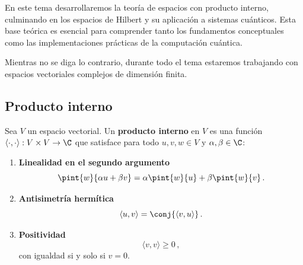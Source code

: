 En este tema desarrollaremos la teoría de espacios con producto interno, culminando en los espacios de Hilbert y su aplicación a sistemas cuánticos. Esta base teórica es esencial para comprender tanto los fundamentos conceptuales como las implementaciones prácticas de la computación cuántica.

Mientras no se diga lo contrario, durante todo el tema estaremos trabajando con espacios vectoriales complejos de dimensión finita.

\subsection{Producto interno}

\begin{defi}
  Sea $V$ un espacio vectorial. Un \textbf{producto interno} en $V$ es una función $\langle \cdot, \cdot \rangle: V \times V \to \C$ que satisface para todo $u, v, w \in V$ y $\alpha, \beta \in \C$:

  \begin{enumerate}
    \item \textbf{Linealidad en el segundo argumento}
          \[
            \pint{w}{\alpha u + \beta v}= \alpha\pint{w}{u} + \beta\pint{w}{v}\,.
          \]

    \item \textbf{Antisimetría hermítica}
          \[
            \langle u, v \rangle = \conj{\langle v, u \rangle}\,.
          \]

    \item \textbf{Positividad}
          \[
            \langle v, v \rangle \geq 0\,,
          \]
          con igualdad si y solo si $v = 0$.
  \end{enumerate}
\end{defi}
\semisepara

